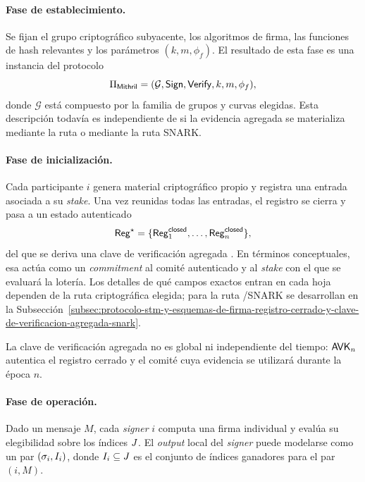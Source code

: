 \paragraph{Fase de establecimiento.}

Se fijan el grupo criptográfico subyacente, los algoritmos de firma, las funciones de hash relevantes y los parámetros $(k,m,\phi_f)$. El resultado de esta fase es una instancia del protocolo
$$\Pi_{\mathsf{Mithril}} = (\mathcal{G}, \mathsf{Sign}, \mathsf{Verify}, k, m, \phi_f),$$
donde $\mathcal{G}$ está compuesto por la familia de grupos y curvas elegidas. Esta descripción todavía es independiente de si la evidencia agregada se materializa mediante la ruta \Concatenation o mediante la ruta SNARK.

\paragraph{Fase de inicialización.}

Cada participante $i$ genera material criptográfico propio y registra una entrada asociada a su \textit{stake}. Una vez reunidas todas las entradas, el registro se cierra y pasa a un estado autenticado
$$\mathsf{Reg}^{\star} = \{\mathsf{Reg}^{\mathsf{closed}}_1,\ldots,\mathsf{Reg}^{\mathsf{closed}}_n\},$$
del que se deriva una clave de verificación agregada \AVK. En términos conceptuales, esa \AVK actúa como un \textit{commitment} al comité autenticado y al \textit{stake} con el que se evaluará la lotería. Los detalles de qué campos exactos entran en cada hoja dependen de la ruta criptográfica elegida; para la ruta \Lagrange/SNARK se desarrollan en la Subsección~\ref{subsec:protocolo-stm-y-esquemas-de-firma-registro-cerrado-y-clave-de-verificacion-agregada-snark}.

La clave de verificación agregada no es global ni independiente del tiempo: $\mathsf{AVK}_n$ autentica el registro cerrado y el comité cuya evidencia se utilizará durante la época $n$.

\paragraph{Fase de operación.}

Dado un mensaje $M$, cada \textit{signer} $i$ computa una firma individual y evalúa su elegibilidad sobre los índices $J$. El \textit{output} local del \textit{signer} puede modelarse como un par
$(\sigma_i, I_i)$, donde $I_i \subseteq J$ es el conjunto de índices ganadores para el par $(i, M)$.

